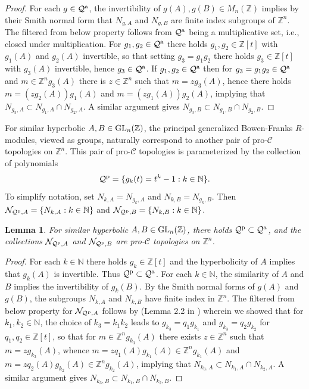 \documentclass{amsart}
\theoremstyle{plain}
\newtheorem{lemma}[theorem]{Lemma}
\theoremstyle{definition}
\theoremstyle{remark}
\begin{document}
\begin{proof} For each $g\in {\mathcal Q}^{\rm a}$, the invertibility of $g(A),g(B)\in M_n({\mathbb Z})$ implies by their Smith normal form that $N_{g,A}$ and $N_{g,B}$ are finite index subgroups of ${\mathbb Z}^n$. The filtered from below property follows from ${\mathcal Q}^{\rm a}$ being a multiplicative set, i.e., closed under multiplication. For $g_1,g_2\in {\mathcal Q}^{\rm a}$ there holds $g_1,g_2\in {\mathbb Z}[t]$ with $g_1(A)$ and $g_2(A)$ invertible, so that setting $g_3 = g_1g_2$ there holds $g_3\in {\mathbb Z}[t]$ with $g_3(A)$ invertible, hence $g_3\in {\mathcal Q}^{\rm a}$. If $g_1,g_2\in {\mathcal Q}^{\rm a}$ then for $g_3 = g_1g_2\in {\mathcal Q}^{\rm a}$ and $m\in {\mathbb Z}^n g_3(A)$ there is $z\in {\mathbb Z}^n$ such that $m = z g_3(A)$, hence there holds $m = (zg_2(A))g_1(A)$ and $m = (zg_1(A))g_2(A)$, implying that $N_{g_3,A} \subset N_{g_1,A}\cap N_{g_2,A}$. A similar argument gives $N_{g_3,B}\subset N_{g_1,B} \cap N_{g_2,B}$.
\end{proof}

For similar hyperbolic $A,B\in {\rm GL}_n({\mathbb Z})$, the principal generalized Bowen-Franks $R$-modules, viewed as groups, naturally correspond to another pair of pro-${\mathcal C}$ topologies on ${\mathbb Z}^n$. This pair of pro-${\mathcal C}$ topologies is parameterized by the collection of polynomials
\[ {\mathcal Q}^{\rm p} = \{ g_k(t) = t^k-1: k\in {\mathbb N}\}.\]
To simplify notation, set $N_{k,A} = N_{g_k,A}$ and $N_{k,B} = N_{g_k,B}$. Then ${\mathcal N}_{ {\mathcal Q}^{\rm p},A} = \{ N_{k,A}: k\in {\mathbb N}\}$ and ${\mathcal N}_{ {\mathcal Q}^{\rm p},B} = \{ N_{k,B} : k\in {\mathbb N}\}$.

\begin{lemma}\label{Qprin} For similar hyperbolic $A,B\in {\rm GL}_n({\mathbb Z})$, there holds ${\mathcal Q}^{\rm p} \subset {\mathcal Q}^{\rm a}$, and the collections ${\mathcal N}_{ {\mathcal Q}^{\rm p},A}$ and ${\mathcal N}_{ {\mathcal Q}^{\rm p},B}$ are pro-${\mathcal C}$ topologies on ${\mathbb Z}^n$.
\end{lemma}

\begin{proof} For each $k\in {\mathbb N}$ there holds $g_k\in{\mathbb Z}[t]$ and the hyperbolicity of $A$ implies that $g_k(A)$ is invertible. Thus ${\mathcal Q}^{\rm p} \subset {\mathcal Q}^{\rm a}$. For each $k\in {\mathbb N}$, the similarity of $A$ and $B$ implies the invertibility of $g_k(B)$. By the Smith normal forms of $g(A)$ and $g(B)$, the subgroups $N_{k,A}$ and $N_{k,B}$ have finite index in ${\mathbb Z}^n$. The filtered from below property for ${\mathcal N}_{ {\mathcal Q}^{\rm p},A}$ follows by (Lemma 2.2 in \cite{BM12}) wherein we showed that for $k_1,k_2\in {\mathbb N}$, the choice of $k_3 = k_1k_2$ leads to $g_{k_3} = q_1g_{k_1}$ and $g_{k_3} = q_2g_{k_2}$ for $q_1,q_2\in {\mathbb Z}[t]$, so that for $m\in {\mathbb Z}^n g_{k_3}(A)$ there exists $z\in {\mathbb Z}^n$ such that $m = zg_{k_3}(A)$, whence $m = zq_1(A)g_{k_1}(A) \in {\mathbb Z}^n g_{k_1}(A)$ and $m = z q_2(A)g_{k_2}(A) \in {\mathbb Z}^n g_{k_2}(A)$, implying that $N_{k_3,A} \subset N_{k_1,A}\cap N_{k_2,A}$. A similar argument gives $N_{k_3,B} \subset N_{k_1,B}\cap N_{k_2,B}$.
\end{proof}
\end{document}
